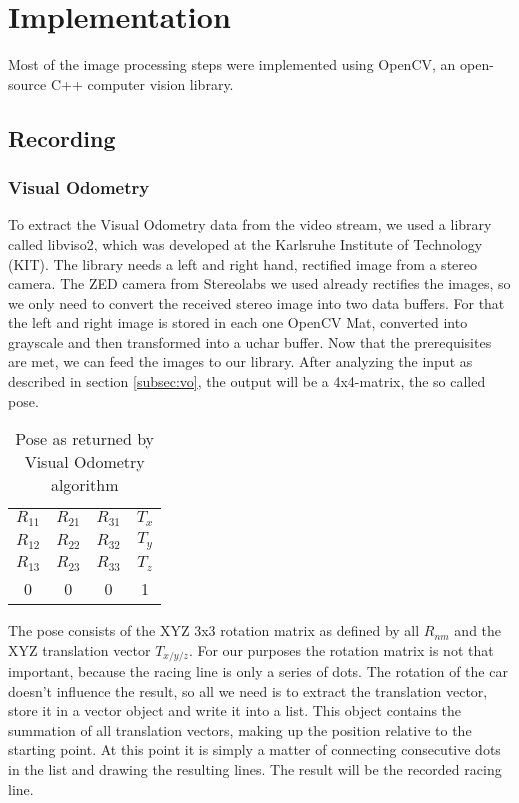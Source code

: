 \section{Implementation}
\label{sec:implementation}

Most of the image processing steps were implemented using OpenCV, an open-source C++ computer vision library. 

\subsection{Recording}
\subsubsection{Visual Odometry}
To extract the Visual Odometry data from the video stream, we used a library called libviso2, which was developed at the Karlsruhe Institute of Technology (KIT). The library needs a left and right hand, rectified image from a stereo camera. The ZED camera from Stereolabs we used already rectifies the images, so we only need to convert the received stereo image into two data buffers.
For that the left and right image is stored in each one OpenCV Mat, converted into grayscale and then transformed into a uchar buffer.
Now that the prerequisites are met, we can feed the images to our library.
After analyzing the input as described in section \ref{subsec:vo}, the output will be a 4x4-matrix, the so called pose.

\begin{table}[!ht]
 \begin{center}
  \begin{tabular}{c c c c}
   $R_{11}$ & $R_{21}$ & $R_{31}$ & $T_{x}$\\
   $R_{12}$ & $R_{22}$ & $R_{32}$ & $T_{y}$\\
   $R_{13}$ & $R_{23}$ & $R_{33}$ & $T_{z}$\\
   0 & 0 & 0 & 1
  \end{tabular}
 \end{center}
 \caption{Pose as returned by Visual Odometry algorithm}
\end{table}

The pose consists of the XYZ 3x3 rotation matrix as defined by all $R_{nm}$ and the XYZ translation vector $T_{x/y/z}$. For our purposes the rotation matrix is not that important, because the racing line is only a series of dots. The rotation of the car doesn't influence the result, so all we need is to extract the translation vector, store it in a vector object and write it into a list. This object contains the summation of all translation vectors, making up the position relative to the starting point.
At this point it is simply a matter of connecting consecutive dots in the list and drawing the resulting lines. The result will be the recorded racing line.

